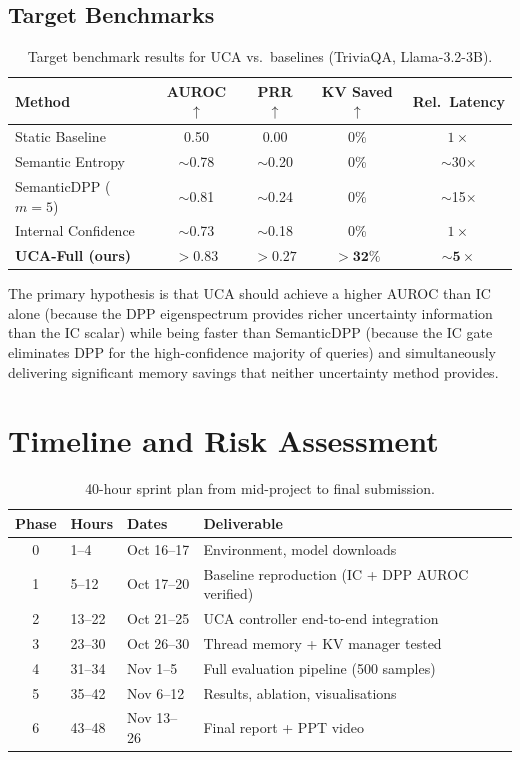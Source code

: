 \documentclass[11pt, a4paper]{article}
\begin{document}
\subsection{Target Benchmarks}

\begin{table}[h]
\centering
\caption{Target benchmark results for UCA vs.\ baselines (TriviaQA, Llama-3.2-3B).}
\label{tab:targets}
\begin{tabular}{lcccc}
\toprule
\textbf{Method} & \textbf{AUROC $\uparrow$} & \textbf{PRR $\uparrow$} & \textbf{KV Saved $\uparrow$} & \textbf{Rel.\ Latency} \\
\midrule
Static Baseline & 0.50 & 0.00 & 0\% & $1\times$ \\
Semantic Entropy & $\sim$0.78 & $\sim$0.20 & 0\% & $\sim$30$\times$ \\
SemanticDPP ($m{=}5$) & $\sim$0.81 & $\sim$0.24 & 0\% & $\sim$15$\times$ \\
Internal Confidence & $\sim$0.73 & $\sim$0.18 & 0\% & $1\times$ \\
\midrule
\textbf{UCA-Full (ours)} & $\mathbf{>0.83}$ & $\mathbf{>0.27}$ & $\mathbf{>32\%}$ & $\mathbf{\sim5\times}$ \\
\bottomrule
\end{tabular}
\end{table}

The primary hypothesis is that UCA should achieve a higher AUROC than IC alone (because the DPP eigenspectrum provides richer uncertainty information than the IC scalar) while being faster than SemanticDPP (because the IC gate eliminates DPP for the high-confidence majority of queries) and simultaneously delivering significant memory savings that neither uncertainty method provides.

\section{Timeline and Risk Assessment}
\label{sec:timeline}

\begin{table}[h]
\centering
\caption{40-hour sprint plan from mid-project to final submission.}
\begin{tabular}{cllp{4.5cm}}
\toprule
\textbf{Phase} & \textbf{Hours} & \textbf{Dates} & \textbf{Deliverable} \\
\midrule
0 & 1--4 & Oct 16--17 & Environment, model downloads \\
1 & 5--12 & Oct 17--20 & Baseline reproduction (IC + DPP AUROC verified) \\
2 & 13--22 & Oct 21--25 & UCA controller end-to-end integration \\
3 & 23--30 & Oct 26--30 & Thread memory + KV manager tested \\
4 & 31--34 & Nov 1--5 & Full evaluation pipeline (500 samples) \\
5 & 35--42 & Nov 6--12 & Results, ablation, visualisations \\
6 & 43--48 & Nov 13--26 & Final report + PPT video \\
\bottomrule
\end{tabular}
\end{table}
\end{document}
